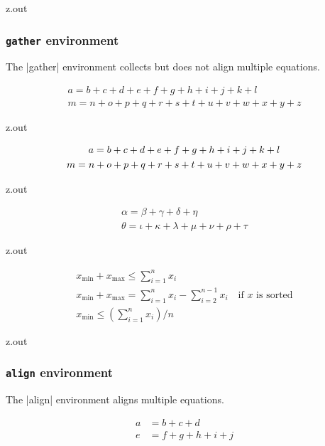\MyIO


\begin{VerbatimOut}{z.out}

\subsubsection{\texttt{gather} environment}

The
|gather|
environment collects but does not align multiple equations.

\begin{gather}
  a = b + c + d + e + f + g + h + i + j + k + l\\
  m = n + o + p + q + r + s + t + u + v + w + x + y + z
\end{gather}
\end{VerbatimOut}

\MyIO


\begin{VerbatimOut}{z.out}

\begin{gather}
  a = b + c + d + e + f + g + h + i + j + k + l\notag\\
  m = n + o + p + q + r + s + t + u + v + w + x + y + z
\end{gather}
\end{VerbatimOut}

\MyIO


\begin{VerbatimOut}{z.out}

\begin{gather*}
  \alpha = \beta + \gamma + \delta + \eta\\
  \theta = \iota + \kappa + \lambda + \mu + \nu + \rho + \tau
\end{gather*}
\end{VerbatimOut}

\MyIO


\begin{VerbatimOut}{z.out}

\begin{gather}
  x_\text{min} + x_\text{max} \le \sum_{i=1}^n x_i\\
  x_\text{min} + x_\text{max}
    = \sum_{i=1}^n x_i - \sum_{i=2}^{n-1} x_i\quad\text{if \(x\) is sorted}\\
  x_\text{min} \le \left(\sum_{i=1}^n x_i\right) / n
\end{gather}
\end{VerbatimOut}

\MyIO


\begin{VerbatimOut}{z.out}

\subsubsection{\texttt{align} environment}

The
|align|
environment aligns multiple equations.

\begin{align}
  a &= b + c + d\\
  e &= f + g + h + i + j
\end{align}
\end{VerbatimOut}

